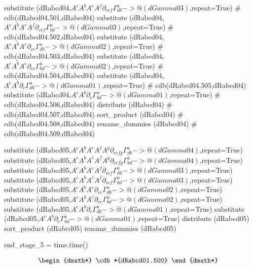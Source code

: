\documentclass[12pt]{cdblatex}
\begin{document}
\begin{cadabra}
   substitute (dRabcd04,$A^{c}A^{b}A^{e}A^{f}\partial_{c e f}{\Gamma^{a}_{d b}} -> @(dGamma03)$,repeat=True)  # cdb(dRabcd04.501,dRabcd04)
   substitute (dRabcd04,$A^{c}A^{b}A^{e}A^{f}\partial_{c e f}{\Gamma^{a}_{b d}} -> @(dGamma03)$,repeat=True)  # cdb(dRabcd04.502,dRabcd04)
   substitute (dRabcd04,$A^{c}A^{b}A^{e}\partial_{c e}{\Gamma^{a}_{d b}} -> @(dGamma02)$,repeat=True)         # cdb(dRabcd04.503,dRabcd04)
   substitute (dRabcd04,$A^{c}A^{b}A^{e}\partial_{c e}{\Gamma^{a}_{b d}} -> @(dGamma02)$,repeat=True)         # cdb(dRabcd04.504,dRabcd04)
   substitute (dRabcd04,$A^{c}A^{b}\partial_{c}{\Gamma^{a}_{d b}} -> @(dGamma01)$,repeat=True)                # cdb(dRabcd04.505,dRabcd04)
   substitute (dRabcd04,$A^{c}A^{b}\partial_{c}{\Gamma^{a}_{b d}} -> @(dGamma01)$,repeat=True)                # cdb(dRabcd04.506,dRabcd04)
   distribute (dRabcd04)                                                                                      # cdb(dRabcd04.507,dRabcd04)
   sort_product   (dRabcd04)                                                                                  # cdb(dRabcd04.508,dRabcd04)
   rename_dummies (dRabcd04)                                                                                  # cdb(dRabcd04.509,dRabcd04)

   substitute (dRabcd05,$A^{c}A^{b}A^{e}A^{f}A^{g}\partial_{c e f g}{\Gamma^{a}_{d b}} -> @(dGamma04)$,repeat=True)
   substitute (dRabcd05,$A^{c}A^{b}A^{e}A^{f}A^{g}\partial_{c e f g}{\Gamma^{a}_{b d}} -> @(dGamma04)$,repeat=True)
   substitute (dRabcd05,$A^{c}A^{b}A^{e}A^{f}\partial_{c e f}{\Gamma^{a}_{d b}} -> @(dGamma03)$,repeat=True)
   substitute (dRabcd05,$A^{c}A^{b}A^{e}A^{f}\partial_{c e f}{\Gamma^{a}_{b d}} -> @(dGamma03)$,repeat=True)
   substitute (dRabcd05,$A^{c}A^{b}A^{e}\partial_{c e}{\Gamma^{a}_{d b}} -> @(dGamma02)$,repeat=True)
   substitute (dRabcd05,$A^{c}A^{b}A^{e}\partial_{c e}{\Gamma^{a}_{b d}} -> @(dGamma02)$,repeat=True)
   substitute (dRabcd05,$A^{c}A^{b}\partial_{c}{\Gamma^{a}_{d b}} -> @(dGamma01)$,repeat=True)
   substitute (dRabcd05,$A^{c}A^{b}\partial_{c}{\Gamma^{a}_{b d}} -> @(dGamma01)$,repeat=True)
   distribute (dRabcd05)
   sort_product   (dRabcd05)
   rename_dummies (dRabcd05)

   end_stage_5 = time.time()
\end{cadabra}

\clearpage

\begin{dgroup*}
   \begin{dmath*} \cdb*{dRabcd01.500} \end{dmath*}
\end{dgroup*}
\end{document}

